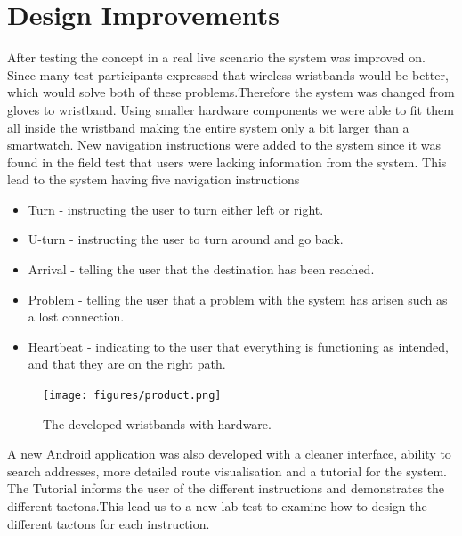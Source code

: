 \documentclass{sigchi}
\begin{document}
\section{Design Improvements}
After testing the concept in a real live scenario the system was improved on. Since many test participants expressed that wireless wristbands would be better, which would solve both of these problems.Therefore the system was changed from gloves to wristband. Using smaller hardware components we were able to fit them all inside the wristband making the entire system only a bit larger than a smartwatch.
New navigation instructions were added to the system since it was found in the field test that users were lacking information from the system. This lead to the system having five navigation instructions
\begin{itemize}
\item Turn - instructing the user to turn either left or right.
\item U-turn - instructing the user to turn around and go back.
\item Arrival - telling the user that the destination has been reached. 
\item Problem - telling the user that a problem with the system has arisen such as a lost connection.
\item Heartbeat - indicating to the user that everything is functioning as intended, and that they are on the right path.
\end{itemize} 
\begin{figure}[!b]
\centering
\texttt{[image: figures/product.png]}
\caption{The developed wristbands with hardware. }\label{fig:product}
\end{figure}
A new Android application was also developed with a cleaner interface, ability to search addresses, more detailed route visualisation and a tutorial for the system. The Tutorial informs the user of the different instructions and demonstrates the different tactons.This lead us to a new lab test to examine how to design the different tactons for each instruction.
\end{document}
